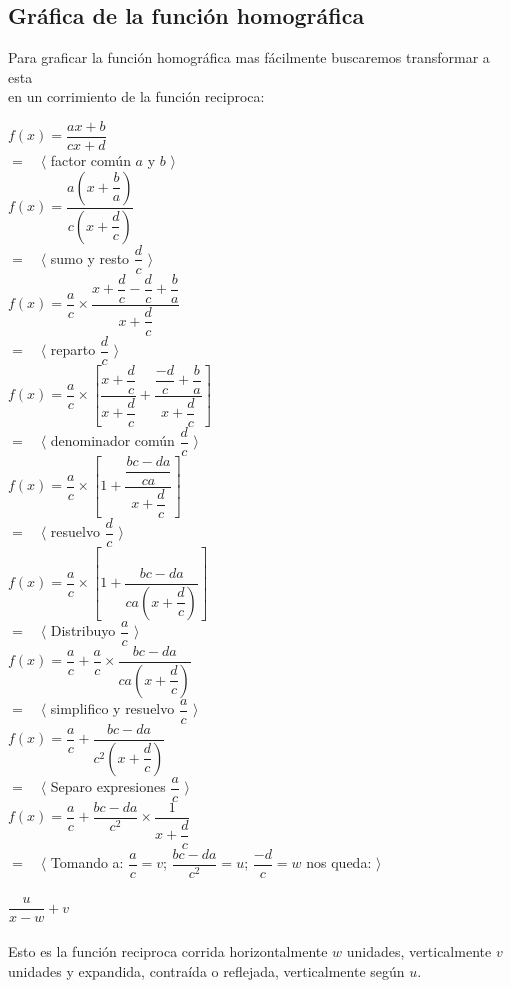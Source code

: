 \subsection{Gráfica de la función homográfica}

Para graficar la función homográfica mas fácilmente buscaremos transformar a esta \\
 en un corrimiento de la función reciproca:
\begin{center}

$f(x)= \dfrac{ax+b}{cx+d}$\\
$= \quad \langle$ factor común $a$ y $b$ $\rangle$\\
$f(x)=  \dfrac{ a \left( x + \dfrac{b}{a} \right) } 
			  { c \left( x + \dfrac{d}{c} \right) }$\\
$= \quad \langle$ sumo y resto $\dfrac{d}{c}$ $\rangle$\\
$f(x)=   \dfrac{a}{c} \times 
	    \dfrac{ x + \dfrac{d}{c} -\dfrac{d}{c} + \dfrac{b}{a}  } 
			  { x + \dfrac{d}{c}  }$\\

$= \quad \langle$ reparto $\dfrac{d}{c}$ $\rangle$\\
$f(x)=   \dfrac{a}{c} \times 
\left[
	    \dfrac{ x + \dfrac{d}{c}  } 
			  { x + \dfrac{d}{c}  }
+
	    \dfrac{ \dfrac{-d}{c} + \dfrac{b}{a}  } 
			  { x + \dfrac{d}{c}  }
\right]$\\
$= \quad \langle$ denominador común $\dfrac{d}{c}$ $\rangle$\\
$f(x)=   \dfrac{a}{c} \times 
\left[
	    1
+
	    \dfrac{ \dfrac{bc-da}{ca}   } 
			  { x + \dfrac{d}{c}  }
\right]$\\
$= \quad \langle$ resuelvo $\dfrac{d}{c}$ $\rangle$\\
$f(x)=   \dfrac{a}{c} \times 
\left[ 1 + \dfrac{bc-da}{ca \left(x + \dfrac{d}{c} \right)} \right]$\\					  
$= \quad \langle$ Distribuyo $\dfrac{a}{c}$ $\rangle$\\
$f(x)=  \dfrac{a}{c} + \dfrac{a}{c} \times 
\dfrac{bc-da}{ca \left(x + \dfrac{d}{c} \right)} $\\		
$= \quad \langle$ simplifico y resuelvo $\dfrac{a}{c}$ $\rangle$\\
$f(x)=  \dfrac{a}{c} + \dfrac{bc-da}{c^2 \left(x + \dfrac{d}{c} \right)} $\\
$= \quad \langle$ Separo expresiones $\dfrac{a}{c}$ $\rangle$\\
$f(x)=  \dfrac{a}{c} + \dfrac{bc-da}{c^2} \times \dfrac{1}{x + \dfrac{d}{c} } $\\	
$= \quad \langle$ Tomando a: $\dfrac{a}{c}=v$; $\dfrac{bc-da}{c^2}=u$; $\dfrac{-d}{c}=w$ \quad nos queda: $\rangle$\\
\qquad \\
$\dfrac{u}{x-w}+v$\\
\qquad \\
Esto es la función reciproca corrida horizontalmente $w$ unidades, verticalmente $v$ unidades y expandida, contraída o reflejada, verticalmente según $u$.
		  
\end{center}

